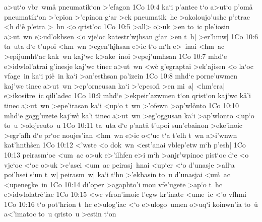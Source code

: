 a>ut`o
vbr~wma\r{}
pneumatik`on
>'efagon\bibvsend
\vs 1Co 10:4
ka`i
p'antec
t`o
a>ut`o
p'oma\r{}
pneumatik`on
>'epion
>'epinon
g`ar
>ek
pneumatik~hc
>akoloujo'ushc
p'etrac
<h
d`e\r{}
p'etra
>~hn
<o
qrist'oc\bibvsend
\vs 1Co 10:5
>all>
o>uk
>en
to~ic
ple'iosin
a>ut~wn
e>ud'okhsen
<o
vje`oc
katestr'wjhsan
g`ar
>en
t~h|
>er'hmw|\bibvsend
\vs 1Co 10:6
ta~uta
d`e
t'upoi
<hm~wn
>egen'hjhsan
e>ic
t`o
m`h
e>~inai
<hm~ac
>epijumht`ac
kak~wn
kaj`wc
k>ake~inoi
>epej'umhsan\bibvsend
\vs 1Co 10:7
mhd`e
e>idwlol'atrai
g'inesje
kaj'wc
tinec
a>ut~wn
<w\r{c}
g'egraptai
>ek'ajisen
<o
la`oc
vfage~in
ka`i
pi\r{e}~in
ka`i
>an'esthsan
pa'izein\bibvsend
\vs 1Co 10:8
mhd`e
porne'uwmen
kaj'wc
tinec
a>ut~wn
>ep'orneusan
ka`i
>'epeson\r{}
>en
mi~a|
<hm'era|
e>ikosi\r{t}re~ic
qili'adec\bibvsend
\vs 1Co 10:9
mhd`e
>ekpeir'azwmen
t`on
qrist`on
kaj`wc
k\r{a}'i
tinec
a>ut~wn
>epe'irasan
ka`i
<up`o
t~wn
>'ofewn
>ap'wl\r{o}nto\bibvsend
{}
\vs 1Co 10:10
mhd`e
gogg'uzete
kaj`wc\r{}
ka'i
tinec
a>ut~wn
>eg'oggusan
ka`i
>ap'wlonto
<up`o
to~u
>olojreuto~u\bibvsend
\vs 1Co 10:11
ta~uta
d`e
p'anta\r{}
t'upoi
sun'ebainon
>eke'inoic
>egr'afh
d`e
pr`oc
noujes'ian
<hm~wn
e>ic
o<`uc
t`a
t'elh
t~wn
a>i'wnwn
kat'hnth\r{s}en\bibvsend
{}
\vs 1Co 10:12
<'wste
<o
dok~wn
<est'anai
vblep'etw
m`h
p'esh|\bibvsend
\vs 1Co 10:13
peirasm`oc
<um~ac
o>uk
e>'ilhfen
e>i
m`h
>anjr'wpinoc
pist`oc
d`e
<o
vje`oc
<`oc
o>uk
>e'asei
<um~ac
peirasj~hnai
<up`er
<`o
d'unasje
>all`a
poi'hsei
s`un
t~w|
peirasm~w|
ka`i
t`hn
>'ekbasin
to~u
d'unasjai
<u\r{m}~ac
<upenegke~in\bibvsend
\vs 1Co 10:14
di'oper
>agaphto'i
mou
vfe'ugete
>ap`o
t~hc
e>idwlolatr\r{e}'iac\bibvsend
{}
\vs 1Co 10:15
<wc
vfron'imoic
l'egw
kr'inate
<ume~ic
<'o
vfhmi\bibvsend
\vs 1Co 10:16
t`o
pot'hrion
t~hc
e>ulog'iac
<`o
e>ulogo~umen
o>uq`i
koinwn'ia
to~u\r{}
a<'imatoc
to~u
qristo~u
>estin
t`on
